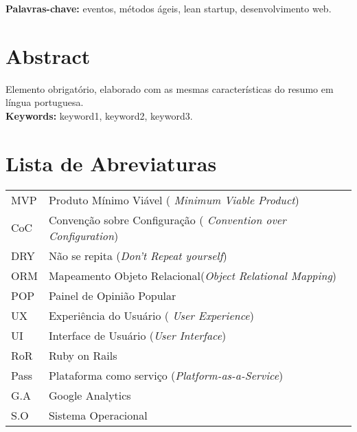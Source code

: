 \documentclass[12pt,twoside,a4paper]{book}
\begin{document}
\noindent \textbf{Palavras-chave:} eventos, métodos ágeis, lean startup, desenvolvimento web.

\chapter*{Abstract}

Elemento obrigatório, elaborado com as mesmas características do resumo em
língua portuguesa.
\\

\noindent \textbf{Keywords:} keyword1, keyword2, keyword3.


\tableofcontents    %




\chapter{Lista de Abreviaturas}
\begin{tabular}{ll}
            MVP         &  Produto Mínimo Viável (\emph{ Minimum Viable Product})\\
            CoC         &  Convenção sobre Configuração (\emph{ Convention over Configuration}) \\
            DRY         &  Não se repita (\emph{Don't Repeat yourself})\\
            ORM         &  Mapeamento Objeto Relacional(\emph{Object Relational Mapping})\\
            POP            &  Painel de Opinião Popular\\
            UX            &  Experiência do Usuário ( \emph{User Experience})\\
            UI            &  Interface de Usuário (\emph{User Interface})\\
            RoR         &  Ruby on Rails\\
            Pass        &  Plataforma como serviço (\emph{Platform-as-a-Service})\\
            G.A			& Google Analytics \\
            S.O			& Sistema Operacional \\
\end{tabular}
\end{document}

